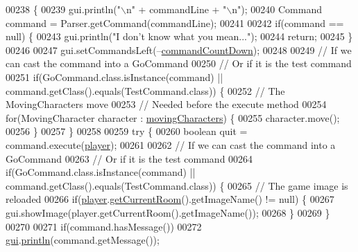 \begin{DoxyCode}
00238                                                    \{
00239         gui.println(\textcolor{stringliteral}{"\(\backslash\)n"} + commandLine + \textcolor{stringliteral}{"\(\backslash\)n"});
00240         Command command = Parser.getCommand(commandLine);
00241 
00242         \textcolor{keywordflow}{if}(command == null) \{
00243             gui.println(\textcolor{stringliteral}{"I don't know what you mean..."});
00244             \textcolor{keywordflow}{return};
00245         \}
00246 
00247         gui.setCommandsLeft(--\hyperlink{classpkg__game_1_1GameEngine_af4ea44f51563b4e2c0a67fe918bf5e3c}{commandCountDown});
00248 
00249         \textcolor{comment}{// If we can cast the command into a GoCommand}
00250         \textcolor{comment}{// Or if it is the test command}
00251         \textcolor{keywordflow}{if}(GoCommand.class.isInstance(command) || command.getClass().equals(TestCommand.class)) \{
00252             \textcolor{comment}{// The MovingCharacters move}
00253             \textcolor{comment}{// Needed before the execute method}
00254             \textcolor{keywordflow}{for}(MovingCharacter character : \hyperlink{classpkg__game_1_1GameEngine_a64a7051b0ae6fb816d566be8ddbab3cb}{movingCharacters}) \{
00255                 character.move();
00256             \}
00257         \}
00258 
00259         \textcolor{keywordflow}{try} \{
00260             \textcolor{keywordtype}{boolean} quit = command.execute(\hyperlink{classpkg__game_1_1GameEngine_a864d14b3375ad026e700ba0c0b9f9d2d}{player});
00261 
00262             \textcolor{comment}{// If we can cast the command into a GoCommand}
00263             \textcolor{comment}{// Or if it is the test command}
00264             \textcolor{keywordflow}{if}(GoCommand.class.isInstance(command) || command.getClass().equals(TestCommand.class)) \{
00265                 \textcolor{comment}{// The game image is reloaded}
00266                 \textcolor{keywordflow}{if}(\hyperlink{classpkg__game_1_1GameEngine_a864d14b3375ad026e700ba0c0b9f9d2d}{player}.\hyperlink{classpkg__world_1_1Player_a5ff0ede152d97c0c9cf6603c9a422a77}{getCurrentRoom}().getImageName() != null) \{
00267                     gui.showImage(player.getCurrentRoom().getImageName());
00268                 \}
00269             \}
00270 
00271             \textcolor{keywordflow}{if}(command.hasMessage())
00272                 \hyperlink{classpkg__game_1_1GameEngine_a152cd31474cc8a5980e32c2cab6e7d36}{gui}.\hyperlink{classpkg__game_1_1UserInterface_ac4d82f989416d7cc64a6e2fba2f4ed75}{println}(command.getMessage());

\end{DoxyCode}
